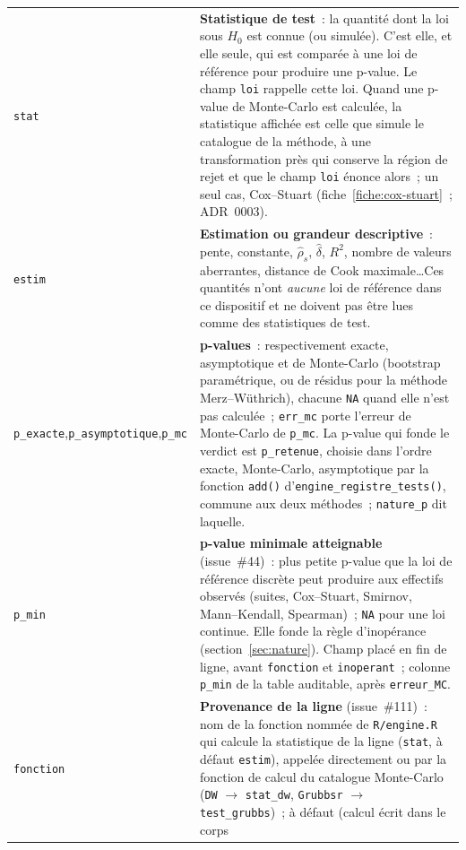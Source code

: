 \documentclass[a4paper,11pt]{article}
\newcommand{\code}[1]{\texttt{\small #1}}
\begin{document}
\begin{center}
\small
\begin{tabular}{@{}p{2.3cm}p{12.9cm}@{}}
\toprule
\code{stat} & \textbf{Statistique de test}~: la quantité dont la loi sous $H_0$ est connue (ou
simulée). C'est elle, et elle seule, qui est comparée à une loi de référence pour produire une
p-value. Le champ \code{loi} rappelle cette loi. Quand une p-value de Monte-Carlo est calculée,
la statistique affichée est celle que simule le catalogue de la méthode, à une transformation
près qui conserve la région de rejet et que le champ \code{loi} énonce alors~; un seul cas,
Cox--Stuart (fiche~\ref{fiche:cox-stuart}~; ADR~0003). \\
\code{estim} & \textbf{Estimation ou grandeur descriptive}~: pente, constante, $\hat\rho_s$,
$\hat\delta$, $R^2$, nombre de valeurs aberrantes, distance de Cook maximale\dots Ces quantités
n'ont \emph{aucune} loi de référence dans ce dispositif et ne doivent pas être lues comme des
statistiques de test. \\
\code{p\_exacte},\newline \code{p\_}\newline\code{asymptotique},\newline \code{p\_mc} & \textbf{p-values}~:
respectivement exacte, asymptotique et de Monte-Carlo (bootstrap paramétrique, ou de résidus
pour la méthode Merz--Wüthrich), chacune \code{NA} quand elle n'est pas calculée~;
\code{err\_mc} porte l'erreur de Monte-Carlo de \code{p\_mc}. La p-value qui fonde le verdict
est \code{p\_retenue}, choisie dans l'ordre exacte, Monte-Carlo, asymptotique par la fonction
\code{add()} d'\code{engine\_registre\_tests()}, commune aux deux méthodes~; \code{nature\_p}
dit laquelle. \\
\code{p\_min} & \textbf{p-value minimale atteignable} (issue~\#44)~: plus petite p-value que
la loi de référence discrète peut produire aux effectifs observés (suites, Cox--Stuart, Smirnov,
Mann--Kendall, Spearman)~; \code{NA} pour une loi continue. Elle fonde la règle d'inopérance
(section~\ref{sec:nature}). Champ placé en fin de ligne, avant \code{fonction} et
\code{inoperant}~; colonne \code{p\_min} de la table auditable, après \code{erreur\_MC}. \\
\code{fonction} & \textbf{Provenance de la ligne} (issue~\#111)~: nom de la fonction nommée de
\code{R/engine.R} qui calcule la statistique de la ligne (\code{stat}, à défaut \code{estim}),
appelée directement ou par la fonction de calcul du catalogue Monte-Carlo (\code{DW} $\to$
\code{stat\_dw}, \code{Grubbsr} $\to$ \code{test\_grubbs})~; à défaut (calcul écrit dans le corps

\end{tabular}
\end{center}
\end{document}
